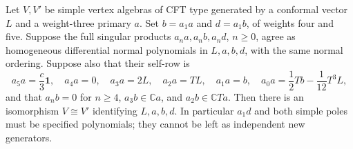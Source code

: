 \begin{proposition}
\label{prop:pf13-finite-reconstruction}
Let $V,V'$ be simple vertex algebras of CFT type generated by a
conformal vector $L$ and a weight-three primary $a$. Set
$b=a_1a$ and $d=a_1b$, of weights four and five. Suppose the full
singular products $a_na,a_nb,a_nd$, $n\geq0$, agree as homogeneous
differential normal polynomials in $L,a,b,d$, with the same normal
ordering. Suppose also that their self-row is
\[
 a_5a=\frac c3\mathbf1,\quad a_4a=0,\quad a_3a=2L,\quad
 a_2a=TL,\quad a_1a=b,\quad a_0a=\frac12Tb-\frac1{12}T^3L,
\]
and that $a_nb=0$ for $n\geq4$, $a_3b\in\mathbb Ca$, and
$a_2b\in\mathbb CTa$. Then there is an isomorphism $V\cong V'$
identifying $L,a,b,d$. In particular $a_1d$ and both simple poles
must be specified polynomials; they cannot be left as independent
new generators.
\end{proposition}
